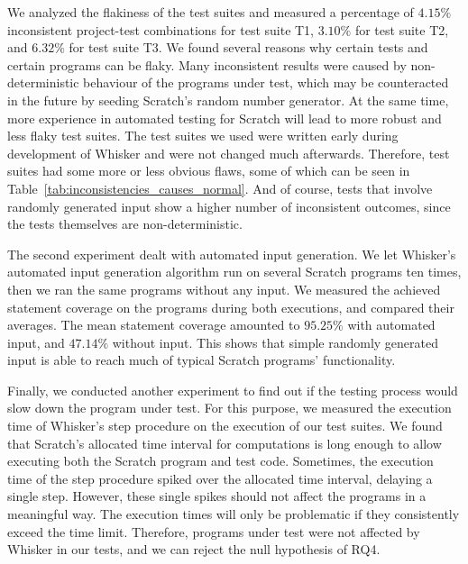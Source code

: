 We analyzed the flakiness of the test suites and measured a percentage of $4.15\%$ inconsistent project-test combinations for test suite T1,
$3.10\%$ for test suite T2, and $6.32\%$ for test suite T3.
We found several reasons why certain tests and certain programs can be flaky.
Many inconsistent results were caused by non-deterministic behaviour of the programs under test,
which may be counteracted in the future by seeding Scratch's random number generator.
At the same time, more experience in automated testing for Scratch will lead to more robust and less flaky test suites.
The test suites we used were written early during development of Whisker and were not changed much afterwards.
Therefore, test suites had some more or less obvious flaws,
some of which can be seen in Table~\ref{tab:inconsistencies_causes_normal}.
And of course, tests that involve randomly generated input show a higher number of inconsistent outcomes,
since the tests themselves are non-deterministic.
\parspace

The second experiment dealt with automated input generation.
We let Whisker's automated input generation algorithm run on several Scratch programs ten times,
then we ran the same programs without any input.
We measured the achieved statement coverage on the programs during both executions,
and compared their averages.
The mean statement coverage amounted to $95.25\%$ with automated input, and $47.14\%$ without input.
This shows that simple randomly generated input is able to reach much of typical Scratch programs' functionality.
\parspace

Finally, we conducted another experiment to find out
if the testing process would slow down the program under test.
For this purpose, we measured the execution time of Whisker's step procedure on the execution of our test suites.
We found that Scratch's allocated time interval for computations is long enough to
allow executing both the Scratch program and test code.
Sometimes, the execution time of the step procedure spiked over the allocated time interval,
delaying a single step.
However, these single spikes should not affect the programs in a meaningful way.
The execution times will only be problematic if they consistently exceed the time limit.
Therefore, programs under test were not affected by Whisker in our tests, and we can reject the null hypothesis of RQ4.


